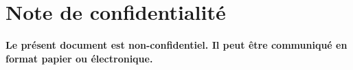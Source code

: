 \chapter*{Note de confidentialité}

\vfill

\begin{center}
{\color{myred}\bfseries
Le présent document est non-confidentiel. Il peut être communiqué en format papier ou électronique.}
\end{center}

\vfill